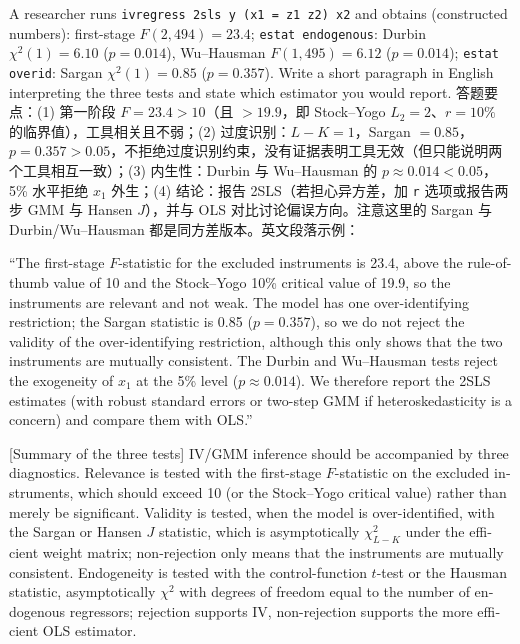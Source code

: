 \begin{prac}\label{pr:U09-c4}
A researcher runs \texttt{ivregress 2sls y (x1 = z1 z2) x2} and obtains (constructed numbers): first-stage $F(2,494)=23.4$; \texttt{estat endogenous}: Durbin $\chi^2(1)=6.10$ ($p=0.014$), Wu--Hausman $F(1,495)=6.12$ ($p=0.014$); \texttt{estat overid}: Sargan $\chi^2(1)=0.85$ ($p=0.357$). Write a short paragraph in English interpreting the three tests and state which estimator you would report.
\answer
答题要点：(1) 第一阶段 $F=23.4>10$（且 $>19.9$，即 Stock--Yogo $L_2=2$、$r=10\%$ 的临界值），工具相关且不弱；(2) 过度识别：$L-K=1$，Sargan $=0.85$，$p=0.357>0.05$，不拒绝过度识别约束，没有证据表明工具无效（但只能说明两个工具相互一致）；(3) 内生性：Durbin 与 Wu--Hausman 的 $p\approx0.014<0.05$，5\% 水平拒绝 $x_1$ 外生；(4) 结论：报告 2SLS（若担心异方差，加 \texttt{r} 选项或报告两步 GMM 与 Hansen $J$），并与 OLS 对比讨论偏误方向。注意这里的 Sargan 与 Durbin/Wu--Hausman 都是同方差版本。英文段落示例：

``The first-stage $F$-statistic for the excluded instruments is 23.4, above the rule-of-thumb value of 10 and the Stock--Yogo 10\% critical value of 19.9, so the instruments are relevant and not weak. The model has one over-identifying restriction; the Sargan statistic is 0.85 ($p=0.357$), so we do not reject the validity of the over-identifying restriction, although this only shows that the two instruments are mutually consistent. The Durbin and Wu--Hausman tests reject the exogeneity of $x_1$ at the 5\% level ($p\approx0.014$). We therefore report the 2SLS estimates (with robust standard errors or two-step GMM if heteroskedasticity is a concern) and compare them with OLS.''
\end{prac}

\begin{english}[Summary of the three tests]
IV/GMM inference should be accompanied by three diagnostics. Relevance is tested with the first-stage $F$-statistic on the excluded instruments, which should exceed 10 (or the Stock--Yogo critical value) rather than merely be significant. Validity is tested, when the model is over-identified, with the Sargan or Hansen $J$ statistic, which is asymptotically $\chi^2_{L-K}$ under the efficient weight matrix; non-rejection only means that the instruments are mutually consistent. Endogeneity is tested with the control-function $t$-test or the Hausman statistic, asymptotically $\chi^2$ with degrees of freedom equal to the number of endogenous regressors; rejection supports IV, non-rejection supports the more efficient OLS estimator.
\end{english}
